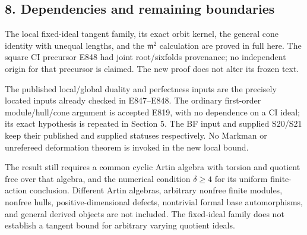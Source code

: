 \subsection{8. Dependencies and remaining boundaries}\label{SF-E849:s8}

The local fixed-ideal tangent family, its exact orbit kernel,
the general cone identity with unequal lengths, and the \(\mathfrak m^2\)
calculation are proved in full here. The square CI precursor
E848 had joint root/sixfolds provenance; no independent origin
for that precursor is claimed. The new proof does not alter
its frozen text.

The published local/global duality and perfectness inputs are
the precisely located inputs already checked in E847--E848.
The ordinary first-order module/hull/cone argument is accepted
E819, with no dependence on a CI ideal; its exact hypothesis
is repeated in Section 5. The BF input and supplied S20/S21
keep their published and supplied statuses respectively.
No Markman or unrefereed deformation theorem is invoked in
the new local bound.

The result still requires a common cyclic Artin algebra with
torsion and quotient free over that algebra, and the numerical
condition \(\delta\ge4\) for its uniform finite-action conclusion.
Different Artin algebras, arbitrary nonfree finite modules,
nonfree hulls, positive-dimensional defects, nontrivial formal
base automorphisms, and general derived objects are not
included. The fixed-ideal family does not establish a tangent
bound for arbitrary varying quotient ideals.
